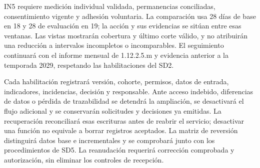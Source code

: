 IN5 requiere medición individual validada, permanencias conciliadas, consentimiento vigente y adhesión voluntaria. La comparación usa 28 días de base en 18 y 28 de evaluación en 19; la acción y sus evidencias se sitúan entre esas ventanas. Las vistas mostrarán cobertura y último corte válido, y no atribuirán una reducción a intervalos incompletos o incomparables. El seguimiento continuará con el informe mensual de 1.12.2.5.m y evidencia anterior a la temporada 2029, respetando las habilitaciones del SD2.

Cada habilitación registrará versión, cohorte, permisos, datos de entrada, indicadores, incidencias, decisión y responsable. Ante acceso indebido, diferencias de datos o pérdida de trazabilidad se detendrá la ampliación, se desactivará el flujo adicional y se conservarán solicitudes y decisiones ya emitidas. La recuperación reconciliará esas escrituras antes de reabrir el servicio; desactivar una función no equivale a borrar registros aceptados. La matriz de reversión distinguirá datos base e incrementales y se comprobará junto con los procedimientos de SD5. La reanudación requerirá corrección comprobada y autorización, sin eliminar los controles de recepción.

